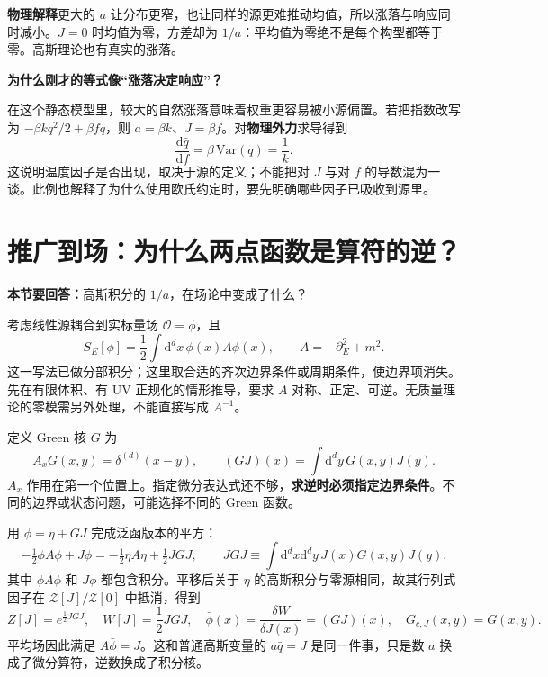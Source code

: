 \documentclass[11pt,a4paper]{article}
\newcommand{\dd}{\mathrm d}
\newcommand{\OO}{\mathcal O}
\newcommand{\ZZ}{\mathcal Z}
\newcommand{\intx}{\int\dd^d x\,}
\newcommand{\physicsnote}[1]{\par\smallskip\noindent\colorbox{pale}{\parbox{\dimexpr\linewidth-2\fboxsep\relax}{\textbf{物理解释}\quad #1}}\par\smallskip}
\newcommand{\question}[1]{\textbf{本节要回答：}#1\par}
\newcommand{\step}[1]{\textbf{#1}\par}
\begin{document}
\physicsnote{更大的 \(a\) 让分布更窄，也让同样的源更难推动均值，所以涨落与响应同时减小。\(J=0\) 时均值为零，方差却为 \(1/a\)：平均值为零绝不是每个构型都等于零。高斯理论也有真实的涨落。}

\step{为什么刚才的等式像“涨落决定响应”？}
在这个静态模型里，较大的自然涨落意味着权重更容易被小源偏置。若把指数改写为
\(-\beta kq^2/2+\beta f q\)，则 \(a=\beta k\)、\(J=\beta f\)。对\textbf{物理外力}求导得到
\begin{equation}
 \frac{\dd\bar q}{\dd f}=\beta\,\mathrm{Var}(q)=\frac1k.
\end{equation}
这说明温度因子是否出现，取决于源的定义；不能把对 \(J\) 与对 \(f\) 的导数混为一谈。此例也解释了为什么使用欧氏约定时，要先明确哪些因子已吸收到源里。

\newpage
\section{推广到场：为什么两点函数是算符的逆？}
\question{高斯积分的 \(1/a\)，在场论中变成了什么？}
考虑线性源耦合到实标量场 \(\OO=\phi\)，且
\begin{equation}
 S_E[\phi]=\frac12\intx\phi(x)A\phi(x),\qquad A=-\partial_E^2+m^2.
\end{equation}
这一写法已做分部积分；这里取合适的齐次边界条件或周期条件，使边界项消失。先在有限体积、有 UV 正规化的情形推导，要求 \(A\) 对称、正定、可逆。无质量理论的零模需另外处理，不能直接写成 \(A^{-1}\)。

定义 Green 核 \(G\) 为
\begin{equation}
 A_xG(x,y)=\delta^{(d)}(x-y),\qquad
 (GJ)(x)=\int\dd^d y\,G(x,y)J(y).
\end{equation}
\(A_x\) 作用在第一个位置上。指定微分表达式还不够，\textbf{求逆时必须指定边界条件}。不同的边界或状态问题，可能选择不同的 Green 函数。

用 \(\phi=\eta+GJ\) 完成泛函版本的平方：
\begin{equation}
 -\tfrac12\phi A\phi+J\phi
 =-\tfrac12\eta A\eta+\tfrac12 JGJ,\qquad
 JGJ\equiv\int\dd^d x\dd^d y\,J(x)G(x,y)J(y).
\end{equation}
其中 \(\phi A\phi\) 和 \(J\phi\) 都包含积分。平移后关于 \(\eta\) 的高斯积分与零源相同，故其行列式因子在 \(\ZZ[J]/\ZZ[0]\) 中抵消，得到
\begin{equation}\label{eq:freeZ}
 Z[J]=e^{\frac12JGJ},\quad W[J]=\frac12JGJ,\quad
 \bar\phi(x)=\frac{\delta W}{\delta J(x)}=(GJ)(x),\quad G_{c,J}(x,y)=G(x,y).
\end{equation}
平均场因此满足 \(A\bar\phi=J\)。这和普通高斯变量的 \(a\bar q=J\) 是同一件事，只是数 \(a\) 换成了微分算符，逆数换成了积分核。
\end{document}
